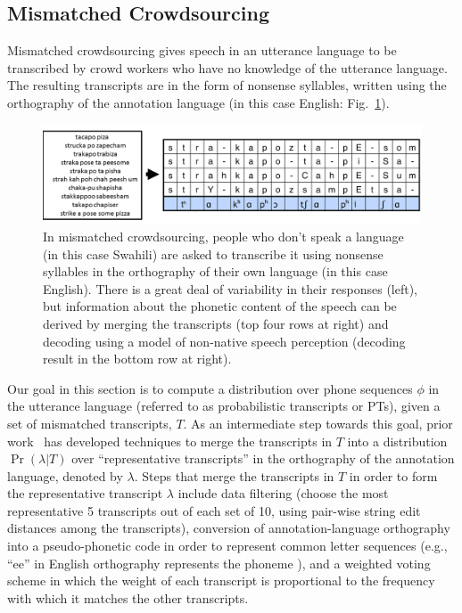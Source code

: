 \subsection{Mismatched Crowdsourcing}
\label{sec:MC}

Mismatched crowdsourcing gives speech in an utterance language to be
transcribed by crowd workers who have no knowledge of the utterance
language.  The resulting transcripts are in the form of nonsense
syllables, written using the orthography of the annotation language (in
this case English: Fig.~\ref{fig:mc}).

\begin{figure}
  \centerline{\includegraphics[width=5in]{../figs/fig_jyothi.png}}
  \caption{In mismatched crowdsourcing, people who don't speak a
    language (in this case Swahili) are asked to transcribe it using
    nonsense syllables in the orthography of their own language (in
    this case English).  There is a great deal of variability in their
    responses (left), but information about the phonetic content of
    the speech can be derived by merging the transcripts (top four
    rows at right) and decoding using a model of non-native speech
    perception (decoding result in the bottom row at right).}
  \label{fig:mc}
\end{figure}

Our goal in this section is to compute a distribution over phone
sequences $\phi$ in the utterance language (referred to as
probabilistic transcripts or PTs), given a set of mismatched
transcripts, $T$.  As an intermediate step towards this goal, prior
work~\cite{JHJ15b} has developed techniques to merge the transcripts
in $T$ into a distribution $\Pr(\lambda|T)$ over ``representative
transcripts'' in the orthography of the annotation language, denoted
by $\lambda$.  Steps that merge the transcripts in $T$ in order to
form the representative transcript $\lambda$ include data filtering
(choose the most representative 5 transcripts out of each set of 10,
using pair-wise string edit distances among the transcripts),
conversion of annotation-language orthography into a pseudo-phonetic
code in order to represent common letter sequences (e.g., ``ee'' in
English orthography represents the phoneme ), and a weighted
voting scheme in which the weight of each transcript is proportional
to the frequency with which it matches the other transcripts.

